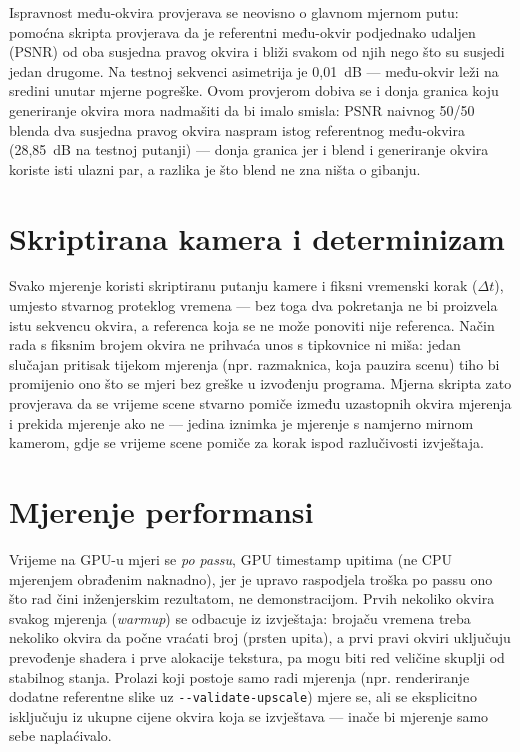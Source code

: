 \documentclass{mathos}
\begin{document}
Ispravnost među-okvira provjerava se neovisno o glavnom mjernom putu:
pomoćna skripta provjerava da je referentni među-okvir podjednako udaljen
(PSNR) od oba susjedna pravog okvira i bliži svakom od njih nego što su
susjedi jedan drugome. Na testnoj sekvenci asimetrija je 0,01~dB — među-okvir
leži na sredini unutar mjerne pogreške. Ovom provjerom dobiva se i donja
granica koju generiranje okvira mora nadmašiti da bi imalo smisla: PSNR
naivnog 50/50 blenda dva susjedna pravog okvira naspram istog referentnog
među-okvira (28,85~dB na testnoj putanji) — donja granica jer i blend i
generiranje okvira koriste isti ulazni par, a razlika je što blend ne zna
ništa o gibanju.

\section{Skriptirana kamera i determinizam}

Svako mjerenje koristi skriptiranu putanju kamere i fiksni vremenski korak
($\Delta t$), umjesto stvarnog proteklog vremena — bez toga dva pokretanja
ne bi proizvela istu sekvencu okvira, a referenca koja se ne može ponoviti
nije referenca. Način rada s fiksnim brojem okvira ne prihvaća unos s
tipkovnice ni miša: jedan slučajan pritisak tijekom mjerenja (npr.
razmaknica, koja pauzira scenu) tiho bi promijenio ono što se mjeri bez
greške u izvođenju programa. Mjerna skripta zato provjerava da se vrijeme
scene stvarno pomiče između uzastopnih okvira mjerenja i prekida mjerenje
ako ne — jedina iznimka je mjerenje s namjerno mirnom kamerom, gdje se
vrijeme scene pomiče za korak ispod razlučivosti izvještaja.

\section{Mjerenje performansi}

Vrijeme na GPU-u mjeri se \emph{po passu}, GPU timestamp upitima (ne CPU
mjerenjem obrađenim naknadno), jer je upravo raspodjela troška po passu ono
što rad čini inženjerskim rezultatom, ne demonstracijom. Prvih nekoliko
okvira svakog mjerenja (\emph{warmup}) se odbacuje iz izvještaja: brojaču
vremena treba nekoliko okvira da počne vraćati broj (prsten upita), a prvi
pravi okviri uključuju prevođenje shadera i prve alokacije tekstura, pa
mogu biti red veličine skuplji od stabilnog stanja. Prolazi koji postoje
samo radi mjerenja (npr. renderiranje dodatne referentne slike uz
\verb+--validate-upscale+) mjere se, ali se eksplicitno isključuju iz
ukupne cijene okvira koja se izvještava — inače bi mjerenje samo sebe
naplaćivalo.
\end{document}
